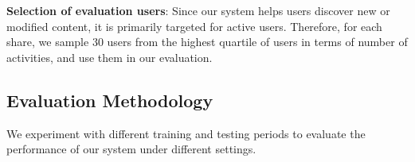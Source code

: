 
\noindent\textbf{Selection of evaluation users}: 
\label{sec:selectusers} 
%
Since our system helps users discover new or modified content, it is
primarily targeted for active users.  Therefore, for each share, we
sample 30 users from the highest quartile of users in terms of number
of activities, and use them in our evaluation.
%
\subsection{Evaluation Methodology}
\label{evalmethodology}
We experiment with different training and testing periods to evaluate the
performance of our system under different settings. 


